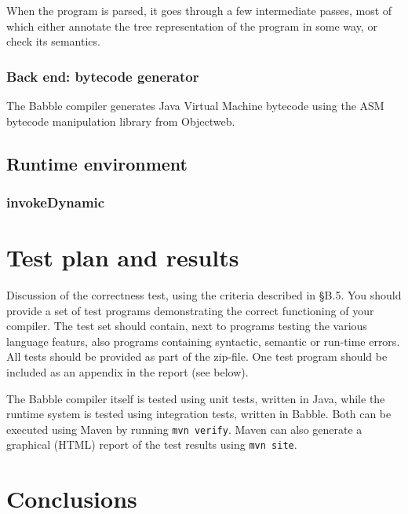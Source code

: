 \documentclass[a4paper]{article}
\begin{document}
When the program is parsed, it goes through a few intermediate passes, most of which either annotate the tree representation of the program in some way, or check its semantics.

\subsubsection{Back end: bytecode generator}

The Babble compiler generates Java Virtual Machine bytecode using the ASM bytecode manipulation library from Objectweb.

\subsection{Runtime environment}

\subsubsection{invokeDynamic}

\section{Test plan and results}
Discussion of the correctness test, using the criteria described in §B.5. You
should provide a set of test programs demonstrating the correct functioning of your compiler. The test
set should contain, next to programs testing the various language featurs, also programs containing
syntactic, semantic or run-time errors.
All tests should be provided as part of the zip-file. One test program should be included as an appendix
in the report (see below).


The Babble compiler itself is tested using unit tests, written in Java, while the runtime system is tested using integration tests, written in Babble.
Both can be executed using Maven by running \texttt{mvn verify}.
Maven can also generate a graphical (HTML) report of the test results using \texttt{mvn site}.

\section{Conclusions}

\clearpage
\end{document}
